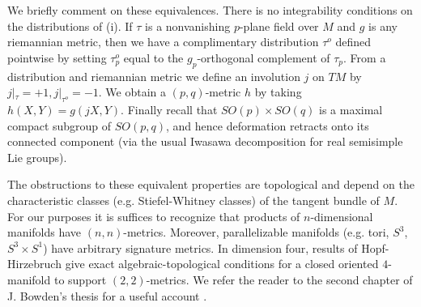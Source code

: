 \documentclass[12pt]{amsart}
\theoremstyle{definition}
\theoremstyle{remark}
\newcommand{\bR}{\mathbb{R}}
\begin{document}
We briefly comment on these equivalences. There is no integrability conditions on the distributions of (i). If $\tau$ is a nonvanishing $p$-plane field over $M$ and $g$ is any riemannian metric, then we have a complimentary distribution $\tau^o$ defined pointwise by setting $\tau^o_p$ equal to the $g_p$-orthogonal complement of $\tau_p$. From a distribution and riemannian metric we define an involution $j$ on $TM$ by $j|_{\tau}=+1, j|_{\tau^o}=-1$. We obtain a $(p,q)$-metric $h$ by taking $h(X,Y)=g(jX,Y)$. Finally recall that $SO(p) \times SO(q)$ is a maximal compact subgroup of $SO(p,q)$, and hence deformation retracts onto its connected component (via the usual Iwasawa decomposition for real semisimple Lie groups).

The obstructions to these equivalent properties are topological and depend on the characteristic classes (e.g. Stiefel-Whitney classes) of the tangent bundle of $M$. For our purposes it is suffices to recognize that products of $n$-dimensional manifolds have $(n,n)$-metrics. Moreover, parallelizable manifolds (e.g. tori, $S^3$, $S^3 \times S^1$) have arbitrary signature metrics. In dimension four, results of Hopf-Hirzebruch give exact algebraic-topological conditions for a closed oriented $4$-manifold to support $(2,2)$-metrics. We refer the reader to the second chapter of J. Bowden's thesis for a useful account \cite{Bowden}. 






\end{document}
